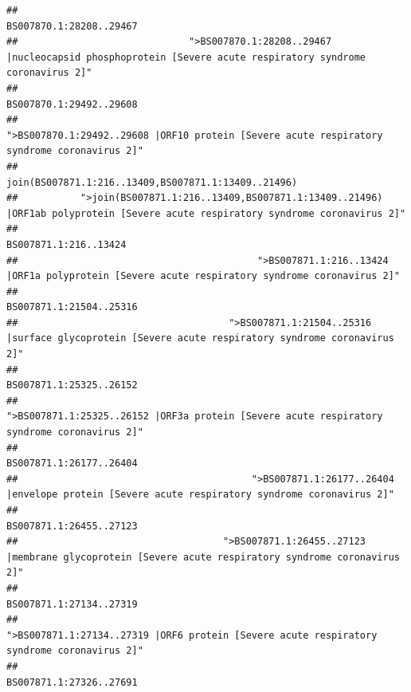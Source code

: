 \documentclass[
]{article}
\begin{document}
\begin{verbatim}
##                                                                                                                BS007870.1:28208..29467 
##                              ">BS007870.1:28208..29467 |nucleocapsid phosphoprotein [Severe acute respiratory syndrome coronavirus 2]" 
##                                                                                                                BS007870.1:29492..29608 
##                                            ">BS007870.1:29492..29608 |ORF10 protein [Severe acute respiratory syndrome coronavirus 2]" 
##                                                                                    join(BS007871.1:216..13409,BS007871.1:13409..21496) 
##           ">join(BS007871.1:216..13409,BS007871.1:13409..21496) |ORF1ab polyprotein [Severe acute respiratory syndrome coronavirus 2]" 
##                                                                                                                  BS007871.1:216..13424 
##                                          ">BS007871.1:216..13424 |ORF1a polyprotein [Severe acute respiratory syndrome coronavirus 2]" 
##                                                                                                                BS007871.1:21504..25316 
##                                     ">BS007871.1:21504..25316 |surface glycoprotein [Severe acute respiratory syndrome coronavirus 2]" 
##                                                                                                                BS007871.1:25325..26152 
##                                            ">BS007871.1:25325..26152 |ORF3a protein [Severe acute respiratory syndrome coronavirus 2]" 
##                                                                                                                BS007871.1:26177..26404 
##                                         ">BS007871.1:26177..26404 |envelope protein [Severe acute respiratory syndrome coronavirus 2]" 
##                                                                                                                BS007871.1:26455..27123 
##                                    ">BS007871.1:26455..27123 |membrane glycoprotein [Severe acute respiratory syndrome coronavirus 2]" 
##                                                                                                                BS007871.1:27134..27319 
##                                             ">BS007871.1:27134..27319 |ORF6 protein [Severe acute respiratory syndrome coronavirus 2]" 
##                                                                                                                BS007871.1:27326..27691 

\end{verbatim}
\end{document}
